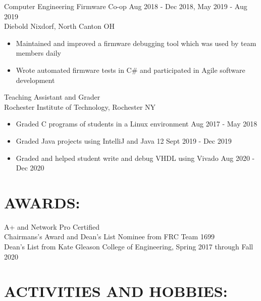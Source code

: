 \documentclass[line,margin]{res}
\newcommand{\SECTIONOFFSET}{-5pt}
\newcommand{\ITEMOFFSET}{-8pt}
\begin{document}
\begin{resume}
		Computer Engineering Firmware Co-op \hfill Aug 2018 - Dec 2018, May 2019 - Aug 2019\\
		Diebold Nixdorf, North Canton OH
		\begin{itemize}
			\item Maintained and improved a firmware debugging tool which was used by team members daily
			\item Wrote automated firmware tests in C\# and participated in Agile software development
		\end{itemize}
		\vspace{\ITEMOFFSET}

		Teaching Assistant and Grader\\
		Rochester Institute of Technology, Rochester NY
		\begin{itemize}
			\item Graded C programs of students in a Linux environment \hfill Aug 2017 - May 2018
			\item Graded Java projects using IntelliJ and Java 12 \hfill Sept 2019 - Dec 2019
			\item Graded and helped student write and debug VHDL using Vivado \hfill Aug 2020 - Dec 2020
		\end{itemize}

		\vspace{\SECTIONOFFSET}

	\section{AWARDS:}

		A+ and Network Pro Certified \\
		Chairmans's Award and Dean's List Nominee from FRC Team 1699 \\
		Dean's List from Kate Gleason College of Engineering, Spring 2017 through Fall 2020
		
		\vspace{\SECTIONOFFSET}

	\section{ACTIVITIES AND HOBBIES:}


\end{resume}
\end{document}
